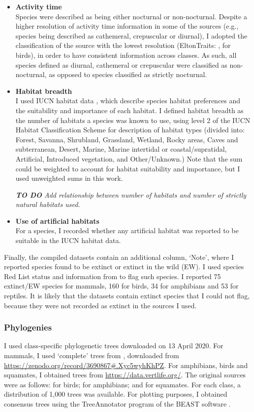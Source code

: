 \begin{itemize}
\item \textbf{Activity time}\\
Species were described as being either nocturnal or non-nocturnal. Despite a higher resolution of activity time information in some of the sources (e.g., species being described as cathemeral, crepuscular or diurnal), I adopted the classification of the source with the lowest resolution (EltonTraits: \citet{Wilman2014}, for birds), in order to have consistent information across classes. As such, all species defined as diurnal, cathemeral or crepuscular were classified as non-nocturnal, as opposed to species classified as strictly nocturnal.

\item \textbf{Habitat breadth}\\
I used IUCN habitat data \citep{IUCN2020}, which describe species habitat preferences and the suitability and importance of each habitat. I defined habitat breadth as the number of habitats a species was known to use, using level 2 of the IUCN Habitat Classification Scheme for description of habitat types (divided into: Forest, Savanna, Shrubland, Grassland, Wetland, Rocky areas, Caves and subterranean, Desert, Marine, Marine intertidal or coastal/supratidal, Artificial, Introduced vegetation, and Other/Unknown.) Note that the sum could be weighted to account for habitat suitability and importance, but I used unweighted sums in this work.

\textit{\textbf{TO DO} Add relationship between number of habitats and number of strictly natural habitats used.}

\item \textbf{Use of artificial habitats}\\
For a species, I recorded whether any artificial habitat was reported to be suitable in the IUCN habitat data.
\end{itemize}

Finally, the compiled datasets contain an additional column, `Note', where I reported species found to be extinct or extinct in the wild (EW). I used species Red List status and information from \citet{Meiri2018GEB} to flag such species. I reported 75 extinct/EW species for mammals, 160 for birds, 34 for amphibians and 53 for reptiles. It is likely that the datasets contain extinct species that I could not flag, because they were not recorded as extinct in the sources I used.

\subsubsection{Phylogenies}
I used class-specific phylogenetic trees downloaded on 13 April 2020. For mammals, I used `complete' trees from \citet{Faurby2018, Faurby2020}, downloaded from \url{https://zenodo.org/record/3690867#.Xyc5wyhKhPZ}. For amphibians, birds and squamates, I obtained trees from \url{https://data.vertlife.org/}. The original sources were as follows: \citet{Jetz2012} for birds; \citet{Jetz2018} for amphibians; and \citet{Tonini2016} for squamates. For each class, a distribution of 1,000 trees was available. For plotting purposes, I obtained consensus trees using the TreeAnnotator program of the BEAST software \citep{Bouckaert2019}.

